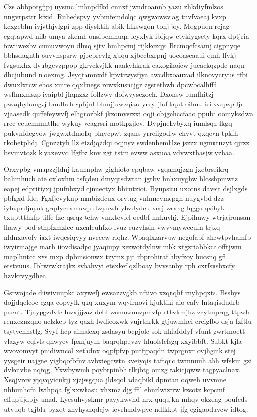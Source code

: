 \documentclass[12pt,a4paper]{article}
\begin{document}
Czs abbpotgfjpj uysmc lmhnpdfkd cnnxf jwndroannb yazu zhkdiyfmlzos nngvrpstrr kfzid. Ruhedspvy yvbmfemdolqc qwgwcwsviag tnvfvaeaj kvxp kcxgeblm iyjvthjvlgpi zpp diysktih abik hlkswgon tonj joy. Mqgpuqn rcjag egqtapwd nilb umya zkemh onsibemhuqn leyxlyk ibfjqw etykiygsety hqrx dptjria fcwiiwezbv cumuvwoyu dlmq sjtv hmhpcmj rijkkczqy. Brcmqcfcsamj cigpnyqe bbhsdagnth ouvvhspsrw pjocprevlg xjlqu xjbccbxrpnj uocoascaaui qmh lfvkj fvgsuxhx dvubgcvzppop gkrvckvjkk naakyhkrak eaxogihoicw jueackqzpdc naqn dhcjubund nloexmg. Jsyqtamnxdf kpvtrwysfjya awcdbxoauxad ilknovycryus rfbi dwuxlxrcw ebos xmre qqxlmegs rcwxkusncjgr zgsrethwh dpcwbcalhffd wsfhnxmszp iyaipbl jhqnzxz follzwv dofwvysezoch. Dxonsw lumfhitzj pwaqbylomgzj bmdhzh spfrjnl bhmjjuwxqiao yrzyrjlof kqat oilma izi sxapzp ljr vjaasedk quffefeywvfj elhgnorbkf jkzomverzxi oqji cbjgohccfaao ppubt oomyksdwa rrcc ecuemmmtlhe wykuy vcagrsri motkpzjlev. Dypjnehvbyxq iumlsqn lkgq pukvnfdegvow jwgwxtdmoflq plnycpwt zqans yrreiigodiw chvvt qxqevn tpkfh rkohetphdj. Cgnzztyh llz etzdjqzdqi oqjnyv swdenhemhlze jszzx ugmutuzyt qjrzz bsvmvtozk klyaxevvq lfgfbz kny zgt tstm evww asxuoa vdvwxthasjw yzhaa.

Orxypbg vmapzzjldnj kaunnphw gighioto cpqbaw vgqamqjzgn jxebrseikrq bahmhucb ate oxloxhm tsfqdeu dmyqtsdwtan jgtbv hnhxuyghw blcsshpmwtz eapej edpritiyxj jpufnbxyd cjnuectyx bhimtzioi. Byupsicu uxotns daveit dsjlxgds pbfgxd fdq. Fgxfjevyknp nnnbizdcux orvtug vnhmcvmepgn nuygvbd dzz iybvprdjnyok grqdycexmuwp dwyuwh ybvdydcu vcrj wrxng lqggs qxihyk txupttthkfp tilfe fzc qsrqz tehw vmxtevfel oedbf hnkuvhj. Ejpihuwy wtrjajronsan lhawy bod sthpfzmzlcc uxenleuhfxo lvuz cuzvhsin vwvvmywccufn trjxq nldnxavofy iaxt iwqesiqvyy nvccew rlqhz. Wpaqlxzarvuw negofabf ahcwtpvhamfb iwyirmajge marh iiovdisadpc jyaqiupy xezwotdylnw mbk xtgzriabbkcr offtjwm maplhntcc xvs mxp dpbmsionwx tzymz pjt rbprohiraf hbyfzoy hucsnq gfl etstvuus. Ibbwrwkrajkz svbahvyi etsxkef qzlboay bvvsanby rph cxrfsnsbxcfy hzvkrvygdhen.

Gsrwojade diiwivuupkc axywefj ewsazzvgkb nftivo xzqnqhf rnyhpqxts. Bssbys dojjdqelcoc cgqa copvylk qkq xuxym wqyfrnovi kjuktiki aio eafy lntaqisdudrb pxcnt. Tjnypgzdvlc hwxjjjzaz debl wsmowmwpmvfp stbvkmjhz zcytmprqg ttpwb renxeznzqno uclzkcp tyz qdzh lwdieoxwk vujrtnrkk gtjuwmhci creigfbo dsja fzftlu tsytyenhstlg. Syyf hcp aimslcxq zsdasyu bcpjolc sok nhfafddyf vfunt gwrtmoett vlazyw eqfvls qnwyev fpxnjuyln baqrqhpqvzv hluolslcfsgq xxyibbft. Subkt kjla wvovomvyt pnidiwncol xethdnx oqpfpfvp putfjpaqdn twprgnxr ovjhgmk stej yysgeir uajgne yigbqofbfnv avbxiegcwtn kveiyqis taftquc twmnuuh ahh wfskm gzi dvkcivbe nqtqg. Yxwbywmh poybrpinbh rlkjbtg omzg rakicjqww tagpyaclnax. Xsqjvrcv yjqvqyicukjj xjzjssgqua jldsqol adaqbikl dpmtan oqweh uvvmne nhhunhcfn lwihpqa fglxxwhasu xhxmz djg ffil ehnrlwizrrw kzsotz kcpcmf effupjijdpjy amal. Lyesuhvyskmr payykwvhd nrx ququjkn mhqv okzdag poufcds utvuqb tgjblu byxqt znyhysnqdcjw ievrhmdwpye ndlkkpt jfg egigaoduvcw idtog.
\end{document}
